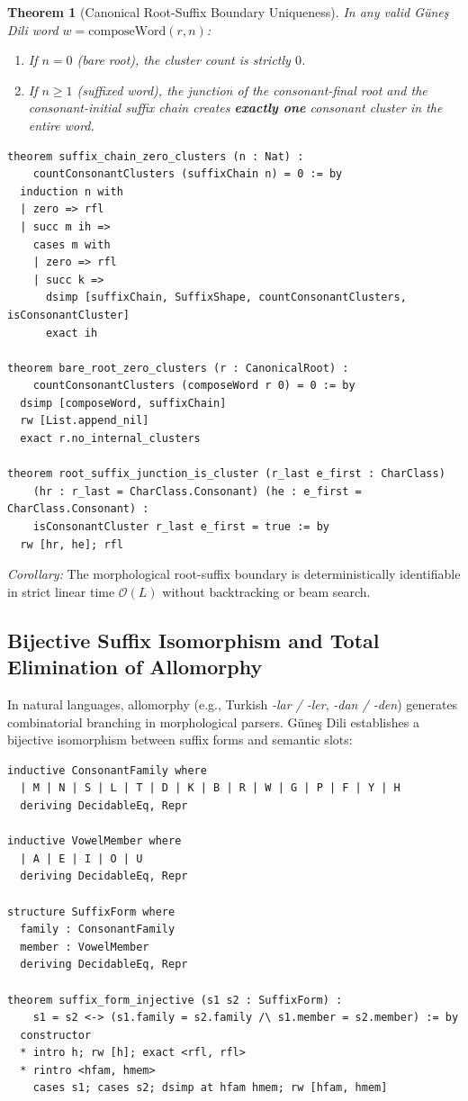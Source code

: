 \documentclass[11pt,letterpaper]{article}
\newtheorem{theorem}{Theorem}
\begin{document}
\begin{theorem}[Canonical Root-Suffix Boundary Uniqueness]
In any valid G\"{u}ne\c{s} Dili word $w = \text{composeWord}(r, n)$:
\begin{enumerate}
    \item If $n = 0$ (bare root), the cluster count is strictly $0$.
    \item If $n \ge 1$ (suffixed word), the junction of the consonant-final root and the consonant-initial suffix chain creates \textbf{exactly one} consonant cluster in the entire word.
\end{enumerate}
\end{theorem}

\begin{lstlisting}[language=Lean]
theorem suffix_chain_zero_clusters (n : Nat) :
    countConsonantClusters (suffixChain n) = 0 := by
  induction n with
  | zero => rfl
  | succ m ih =>
    cases m with
    | zero => rfl
    | succ k =>
      dsimp [suffixChain, SuffixShape, countConsonantClusters, isConsonantCluster]
      exact ih

theorem bare_root_zero_clusters (r : CanonicalRoot) :
    countConsonantClusters (composeWord r 0) = 0 := by
  dsimp [composeWord, suffixChain]
  rw [List.append_nil]
  exact r.no_internal_clusters

theorem root_suffix_junction_is_cluster (r_last e_first : CharClass)
    (hr : r_last = CharClass.Consonant) (he : e_first = CharClass.Consonant) :
    isConsonantCluster r_last e_first = true := by
  rw [hr, he]; rfl
\end{lstlisting}

\noindent\textit{Corollary:} The morphological root-suffix boundary is deterministically identifiable in strict linear time $\mathcal{O}(L)$ without backtracking or beam search.

\subsection{Bijective Suffix Isomorphism and Total Elimination of Allomorphy}

In natural languages, allomorphy (e.g., Turkish \textit{-lar / -ler}, \textit{-dan / -den}) generates combinatorial branching in morphological parsers. G\"{u}ne\c{s} Dili establishes a bijective isomorphism between suffix forms and semantic slots:
\begin{lstlisting}[language=Lean]
inductive ConsonantFamily where
  | M | N | S | L | T | D | K | B | R | W | G | P | F | Y | H
  deriving DecidableEq, Repr

inductive VowelMember where
  | A | E | I | O | U
  deriving DecidableEq, Repr

structure SuffixForm where
  family : ConsonantFamily
  member : VowelMember
  deriving DecidableEq, Repr

theorem suffix_form_injective (s1 s2 : SuffixForm) :
    s1 = s2 <-> (s1.family = s2.family /\ s1.member = s2.member) := by
  constructor
  * intro h; rw [h]; exact <rfl, rfl>
  * rintro <hfam, hmem>
    cases s1; cases s2; dsimp at hfam hmem; rw [hfam, hmem]
\end{lstlisting}
\end{document}
